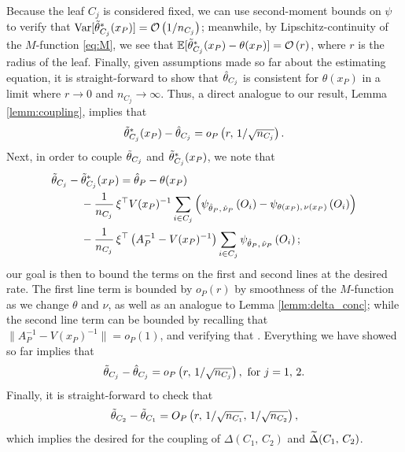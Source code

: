 \documentclass[aos]{imsart}
\theoremstyle{plain}
\theoremstyle{definition}
\theoremstyle{remark}
\begin{document}
\begin{CJK}{UTF8}{gbsn}
{\begin{appendix}
Because the leaf $C_j$ is considered fixed, we can use second-moment bounds on $\psi$
to verify that $\operatorname{Var}[\tilde{\theta}_{C_j}^*(x_P)] = \mathcal{O}\left(1/n_{C_j}\right)$; meanwhile,
by Lipschitz-continuity of the $M$-function \eqref{eq:M}, we see that
$\mathbb{E}[\tilde{\theta}_{C_j}^*(x_P) - \theta(x_P)] = \mathcal{O}\left(r\right)$, where $r$ is the radius
of the leaf. Finally, given assumptions made so far about the estimating equation,
it is straight-forward to show that $\hat{\theta}_{C_j}$ is consistent for $\theta(x_P)$ in a
limit where $r \rightarrow 0$ and $n_{C_j} \rightarrow \infty$. Thus, a direct analogue to
our result, Lemma \ref{lemm:coupling}, implies that
\begin{equation}
\ttheta_{C_j}^*(x_P) - \htheta_{C_j} = o_P\p{r, \, 1/\sqrt{n_{C_j}}}.
\end{equation}
Next, in order to couple $\tilde{\theta}_{C_j}$ and $\tilde{\theta}_{C_j}^*(x_P)$, we note that
\begin{equation}
\begin{split}
&\ttheta_{C_j} - \ttheta_{C_j}^*(x_P) = \htheta_P - \theta(x_P) \\
&\ \ \ \ \ \ \ \ 
- \frac{1}{n_{C_j}} \, \xi^\top V(x_P)^{-1}\sum_{i \in C_j}  \p{\psi_{\htheta_P, \, \hnu_P}\p{O_i} -  \psi_{\theta(x_P), \, \nu(x_P)}\p{O_i}} \\
& \ \ \ \ \ \ \ \ 
 - \frac{1}{n_{C_j}} \, \xi^\top \p{A_P^{-1} - V(x_P)^{-1}} \sum_{i \in C_j} \psi_{\htheta_P, \, \hnu_P}\p{O_i};
\end{split}
\end{equation}
our goal is then to bound the terms on the first and second lines at the desired rate.
The first line term is bounded by $o_P(r)$ by smoothness of the $M$-function as
we change $\theta$ and $\nu$, as well as an analogue to Lemma \ref{lemm:delta_conc};
while the second line term can be bounded by recalling that $\|A_P^{-1} - V(x_P)^{-1}\| = o_P(1)$,
and verifying that .
Everything we have showed so far implies that
\begin{equation}
\ttheta_{C_j} - \htheta_{C_j} = o_P\p{r, \, 1/\sqrt{n_{C_j}}}, \eqfor j = 1, \, 2.
\end{equation}
Finally, it is straight-forward to check that
\begin{equation}
\ttheta_{C_2} - \ttheta_{C_1} = O_P\p{r, \, 1/\sqrt{n_{C_1}}, \, 1/\sqrt{n_{C_2}}},
\end{equation}
which implies the desired for the coupling of $\Delta(C_1, \, C_2)$ and $\widetilde{\Delta}(C_1, \, C_2)$.


\end{appendix}}
\end{CJK}
\end{document}

